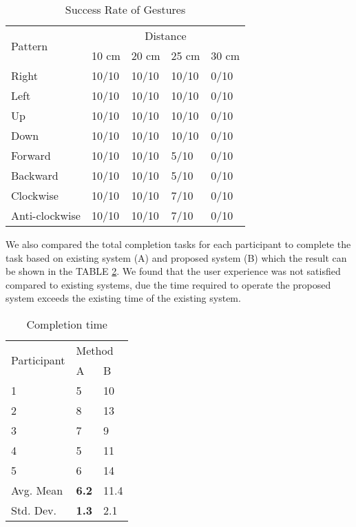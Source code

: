 \documentclass[conference,a4paper]{IEEEtran}
\begin{document}
\begin{table}[hbt!]
\centering
\caption{Success Rate of Gestures}
\begin{tabular}{lllll}
\toprule
\multirow{2}{*}{Pattern} & \multicolumn{4}{c}{Distance}                                                          \\ \cmidrule(r){2-5} 
                         & \multicolumn{1}{l}{10 cm}    & \multicolumn{1}{l}{20 cm}    & \multicolumn{1}{l}{25 cm}    & 30 cm\\   
\midrule
Right                    & \multicolumn{1}{l}{10/10} & \multicolumn{1}{l}{10/10} & \multicolumn{1}{l}{10/10} & 0/10 \\
Left                     & \multicolumn{1}{l}{10/10} & \multicolumn{1}{l}{10/10} & \multicolumn{1}{l}{10/10} & 0/10 \\
Up                       & \multicolumn{1}{l}{10/10} & \multicolumn{1}{l}{10/10} & \multicolumn{1}{l}{10/10} & 0/10 \\
Down                     & \multicolumn{1}{l}{10/10} & \multicolumn{1}{l}{10/10} & \multicolumn{1}{l}{10/10} & 0/10 \\
Forward                  & \multicolumn{1}{l}{10/10} & \multicolumn{1}{l}{10/10} & \multicolumn{1}{l}{5/10} & 0/10 \\
Backward                 & \multicolumn{1}{l}{10/10} & \multicolumn{1}{l}{10/10} & \multicolumn{1}{l}{5/10} & 0/10 \\
Clockwise                & \multicolumn{1}{l}{10/10} & \multicolumn{1}{l}{10/10} & \multicolumn{1}{l}{7/10} & 0/10 \\
Anti-clockwise           & \multicolumn{1}{l}{10/10} & \multicolumn{1}{l}{10/10} & \multicolumn{1}{l}{7/10} & 0/10 \\ 
\bottomrule
\end{tabular}
\label{table3}
\end{table}

We also compared the total completion tasks for each participant to complete the task based on existing system (A) and proposed system (B) which the result can be shown in the TABLE \ref{table4}. We found that the user experience was not satisfied compared to existing systems, due the time required to operate the proposed system exceeds the existing time of the existing system.

\begin{table}[!h]
\centering
\caption{Completion time}
\begin{tabular}{lll}
\toprule
\multirow{2}{*}{Participant} & \multicolumn{2}{l}{Method} \\
\cmidrule(r){2-3} 
& A & B \\ 
\midrule
1 &	5 &	10 \\
2 &	8 &	13 \\
3 &	7 &	9 \\
4 &	5 &	11 \\
5 &	6 &	14 \\
\midrule
Avg. Mean &	\textbf{6.2} & 11.4 \\
Std. Dev. & \textbf{1.3} & 2.1 \\
\bottomrule
\end{tabular}
\label{table4}
\end{table}
\end{document}
